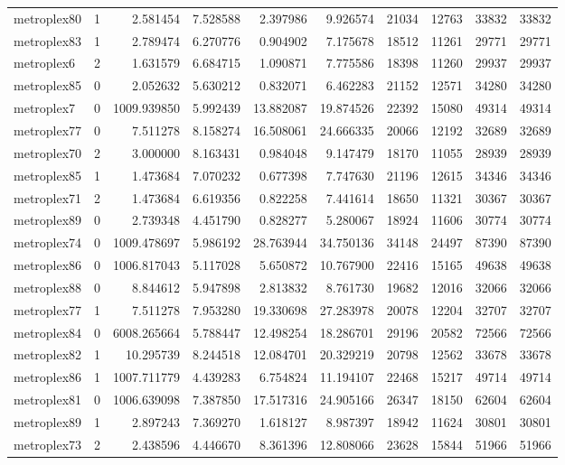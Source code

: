 \begin{longtable}{|l|r|r|r|r|r|r|r|r|r|}
metroplex80 & 1 & 2.581454 & 7.528588 & 2.397986 & 9.926574 & 21034 & 12763 & 33832 & 33832 \\
metroplex83 & 1 & 2.789474 & 6.270776 & 0.904902 & 7.175678 & 18512 & 11261 & 29771 & 29771 \\
metroplex6 & 2 & 1.631579 & 6.684715 & 1.090871 & 7.775586 & 18398 & 11260 & 29937 & 29937 \\
metroplex85 & 0 & 2.052632 & 5.630212 & 0.832071 & 6.462283 & 21152 & 12571 & 34280 & 34280 \\
metroplex7 & 0 & 1009.939850 & 5.992439 & 13.882087 & 19.874526 & 22392 & 15080 & 49314 & 49314 \\
metroplex77 & 0 & 7.511278 & 8.158274 & 16.508061 & 24.666335 & 20066 & 12192 & 32689 & 32689 \\
metroplex70 & 2 & 3.000000 & 8.163431 & 0.984048 & 9.147479 & 18170 & 11055 & 28939 & 28939 \\
metroplex85 & 1 & 1.473684 & 7.070232 & 0.677398 & 7.747630 & 21196 & 12615 & 34346 & 34346 \\
metroplex71 & 2 & 1.473684 & 6.619356 & 0.822258 & 7.441614 & 18650 & 11321 & 30367 & 30367 \\
metroplex89 & 0 & 2.739348 & 4.451790 & 0.828277 & 5.280067 & 18924 & 11606 & 30774 & 30774 \\
metroplex74 & 0 & 1009.478697 & 5.986192 & 28.763944 & 34.750136 & 34148 & 24497 & 87390 & 87390 \\
metroplex86 & 0 & 1006.817043 & 5.117028 & 5.650872 & 10.767900 & 22416 & 15165 & 49638 & 49638 \\
metroplex88 & 0 & 8.844612 & 5.947898 & 2.813832 & 8.761730 & 19682 & 12016 & 32066 & 32066 \\
metroplex77 & 1 & 7.511278 & 7.953280 & 19.330698 & 27.283978 & 20078 & 12204 & 32707 & 32707 \\
metroplex84 & 0 & 6008.265664 & 5.788447 & 12.498254 & 18.286701 & 29196 & 20582 & 72566 & 72566 \\
metroplex82 & 1 & 10.295739 & 8.244518 & 12.084701 & 20.329219 & 20798 & 12562 & 33678 & 33678 \\
metroplex86 & 1 & 1007.711779 & 4.439283 & 6.754824 & 11.194107 & 22468 & 15217 & 49714 & 49714 \\
metroplex81 & 0 & 1006.639098 & 7.387850 & 17.517316 & 24.905166 & 26347 & 18150 & 62604 & 62604 \\
metroplex89 & 1 & 2.897243 & 7.369270 & 1.618127 & 8.987397 & 18942 & 11624 & 30801 & 30801 \\
metroplex73 & 2 & 2.438596 & 4.446670 & 8.361396 & 12.808066 & 23628 & 15844 & 51966 & 51966 \\

\end{longtable}
